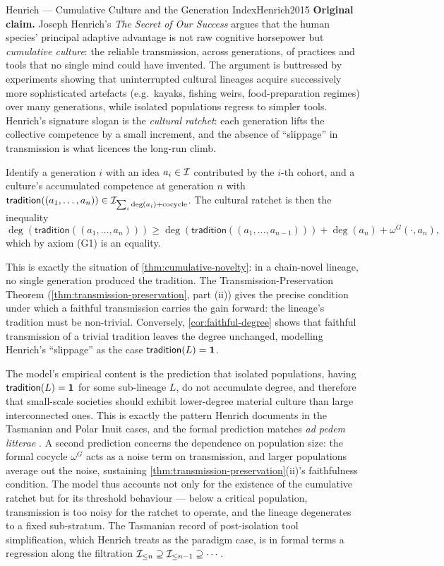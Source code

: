 \begin{zooentry}{Henrich --- Cumulative Culture and the Generation Index}{Henrich2015}
\textbf{Original claim.} Joseph Henrich's \emph{The Secret of Our
Success} \cite{Henrich2015} argues that the human species' principal
adaptive advantage is not raw cognitive horsepower but \emph{cumulative
culture}: the reliable transmission, across generations, of practices
and tools that no single mind could have invented. The argument is
buttressed by experiments showing that uninterrupted cultural lineages
acquire successively more sophisticated artefacts (e.g.\ kayaks,
fishing weirs, food-preparation regimes) over many generations, while
isolated populations regress to simpler tools. Henrich's signature
slogan is the \emph{cultural ratchet}: each generation lifts the
collective competence by a small increment, and the absence of
``slippage'' in transmission is what licences the long-run climb.

\formalclaim Identify a generation $i$ with an idea $a_i\in \mathcal{I}$
contributed by the $i$-th cohort, and a culture's accumulated
competence at generation $n$ with $\mathsf{tradition}((a_1,\dots,a_n))
\in \mathcal{I}_{\sum_i \deg(a_i) + \text{cocycle}}$. The cultural ratchet
is then the inequality
\[
  \deg(\mathsf{tradition}((a_1,\dots,a_n))) \ge
  \deg(\mathsf{tradition}((a_1,\dots,a_{n-1}))) + \deg(a_n) +
  \omega^G(\cdot,a_n),
\]
which by axiom (G1) is an equality.

\formalstatus This is exactly the situation of
\cref{thm:cumulative-novelty}: in a chain-novel lineage, no single
generation produced the tradition. The
Transmission-Preservation Theorem (\cref{thm:transmission-preservation},
part (ii)) gives the precise condition under which a faithful
transmission carries the gain forward: the lineage's tradition must be
non-trivial. Conversely, \cref{cor:faithful-degree} shows that
faithful transmission of a trivial tradition leaves the degree
unchanged, modelling Henrich's ``slippage'' as the case
$\mathsf{tradition}(L)=\mathbf{1}$.

\litcomment The model's empirical content is the prediction that
isolated populations, having $\mathsf{tradition}(L)=\mathbf{1}$ for some
sub-lineage $L$, do not accumulate degree, and therefore that
small-scale societies should exhibit lower-degree material culture
than large interconnected ones. This is exactly the pattern Henrich
documents in the Tasmanian and Polar Inuit cases, and the formal
prediction matches \emph{ad pedem litterae} \cite{Henrich2015}.
A second prediction concerns the dependence on population size: the
formal cocycle $\omega^G$ acts as a noise term on transmission, and
larger populations average out the noise, sustaining
\cref{thm:transmission-preservation}(ii)'s faithfulness condition.
The model thus accounts not only for the existence of the cumulative
ratchet but for its threshold behaviour --- below a critical
population, transmission is too noisy for the ratchet to operate, and
the lineage degenerates to a fixed sub-stratum. The Tasmanian record
of post-isolation tool simplification, which Henrich treats as the
paradigm case, is in formal terms a regression along the filtration
$\mathcal{I}_{\le n} \supseteq \mathcal{I}_{\le n-1}\supseteq\cdots$.
\end{zooentry}

